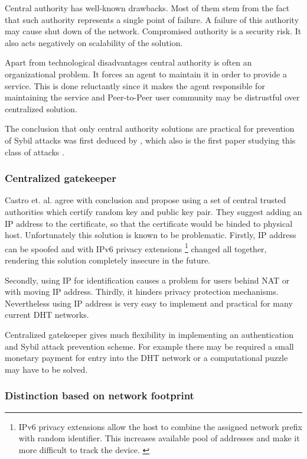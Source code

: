   Central authority has well-known drawbacks. Most of them stem from the fact
  that such authority represents a single point of failure. A failure of this
  authority may cause shut down of the network. Compromised authority is a
  security risk. It also acts negatively on scalability of the solution.
  
  Apart from technological disadvantages central authority is often an
  organizational problem. It forces an agent to maintain it in order to provide
  a service. This is done reluctantly since it makes the agent responsible for
  maintaining the service and Peer-to-Peer user community may be distrustful
  over centralized solution.

  The conclusion that only central authority solutions are practical for
  prevention of Sybil attacks was first deduced by \cite{dou02}, which also is
  the first paper studying this class of attacks \cite{urd11}.

  \subsubsection{Centralized gatekeeper}
  Castro et. al. \cite{cas02} agree with \cite{dou02} conclusion and propose
  using a set of central trusted authorities which certify random key and public
  key pair. They suggest adding an IP address to the certificate, so that the
  certificate would be binded to physical host. Unfortunately this solution is
  known to be problematic. Firstly, IP address can be spoofed and with IPv6
  privacy extensions 
  \footnote{IPv6 privacy extensions allow the host to combine the assigned
    network prefix with random identifier. This increases available pool of
    addresses and make it more difficult to track the device.
  \cite{nar01}}
  changed all together, rendering this solution completely
  insecure in the future.
  
  Secondly, using IP for identification causes a problem
  for users behind NAT or with moving IP address. Thirdly, it hinders privacy
  protection mechanisms. Nevertheless using IP address is very easy to implement
  and practical for many current DHT networks.

  Centralized gatekeeper gives much flexibility in implementing an
  authentication and Sybil attack prevention scheme. For example there may be
  required a small monetary payment for entry into the DHT network or a
  computational puzzle may have to be solved.

  \subsubsection{Distinction based on network footprint}

